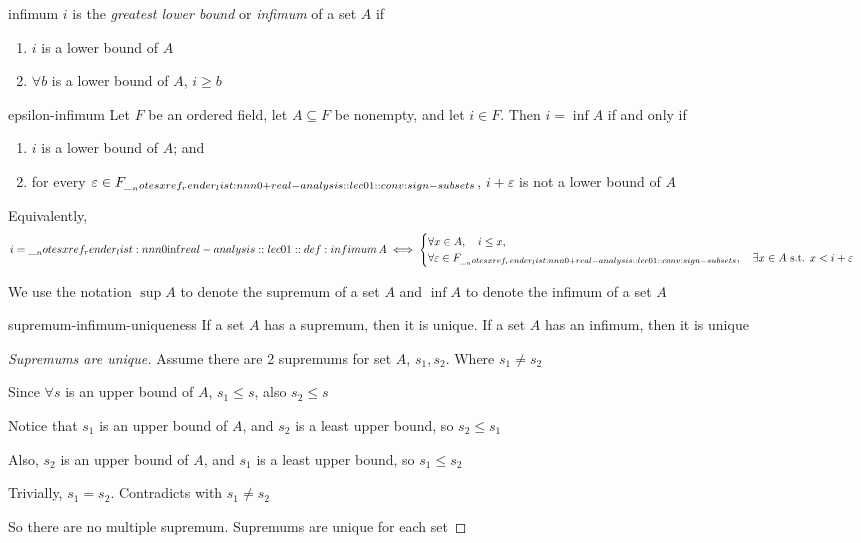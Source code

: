 \documentclass[12pt]{article}
\begin{document}
\begin{dfn}{infimum} 
  $i$ is the \emph{greatest lower bound} or \emph{infimum} of a set \(A\) if 
  \begin{enumerate}[nosep]
    \item $i$ is a lower bound of \(A\)
    \item $\forall b$ is a lower bound of \(A\), $i \geq b$ 
  \end{enumerate}
  \par\smallskip{}
\end{dfn} 

\begin{prop}
{epsilon-infimum}
  Let \(F\) be an ordered field, let \(A\subseteq F\) be nonempty, and
  let \(i\in F\).
  Then \(i=\inf A\) if and only if
  \begin{enumerate}[nosep]
    \item \(i\) is a lower bound of \(A\); and
    \item for every \(\varepsilon\in\apos{F}\),
      \(i+\varepsilon\) is not a lower bound of \(A\)
  \end{enumerate}
  Equivalently,
  \[
    i=\inf A
    \iff
    \begin{cases}
      \forall x\in A,\quad i\leq x,\\
      \forall\varepsilon\in\apos{F},\quad
      \exists x\in A\text{ s.t. }x<i+\varepsilon
    \end{cases}
  \]
\end{prop}

\begin{conv}
  We use the notation $\sup A$ to denote the supremum of a set \(A\) and $\inf A$ to denote the infimum of a set \(A\)
\end{conv} 

\begin{rem}{supremum-infimum-uniqueness}
  If a set \(A\) has a supremum, then it is unique. If a set \(A\) has an infimum, then it is unique
\end{rem} 

\begin{proof}[Supremums are unique]
  Assume there are 2 supremums for set \(A\), \(s_1, s_2\). Where $s_1 \neq s_2$

  Since $\forall s$ is an upper bound of \(A\), $s_1 \leq s$, also $s_2 \leq s$

  Notice that $s_1$ is an upper bound of \(A\), and $s_2$ is a least upper bound, so $s_2 \leq s_1$

  Also, $s_2$ is an upper bound of \(A\), and $s_1$ is a least upper bound, so $s_1 \leq s_2$

  Trivially, $s_1 = s_2$. Contradicts with $s_1 \neq s_2$

  So there are no multiple supremum. Supremums are unique for each set
\end{proof} 
\end{document}
